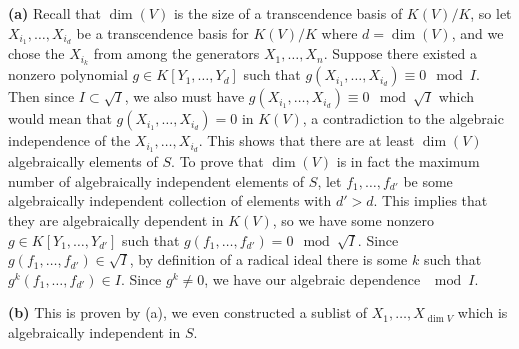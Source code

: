 \documentclass[11pt,letterpaper]{article}
\begin{document}
\begin{solution}
    \textbf{(a)} Recall that $\dim(V)$ is the size of a transcendence basis of $K(V)/K$, so let $X_{i_1}, \ldots, X_{i_d}$ be a transcendence basis for $K(V) /K$ where $d=\dim(V)$, and we chose the $X_{i_k}$ from among the generators $X_1,\ldots,X_n$. Suppose there existed a nonzero polynomial $g\in K[Y_1,\ldots,Y_d]$ such that $g(X_{i_1},\ldots,X_{i_d})\equiv 0\mod I$. Then since $I\subset \sqrt{I}$, we also must have $g(X_{i_1},\ldots,X_{i_d})\equiv 0\mod \sqrt{I}$ which would mean that $g(X_{i_1},\ldots,X_{i_d})=0$ in $K(V)$, a contradiction to the algebraic independence of the $X_{i_1},\ldots,X_{i_d}$. This shows that there are at least $\dim(V)$ algebraically elements of $S$. To prove that $\dim(V)$ is in fact the maximum number of algebraically independent elements of $S$, let $f_1,\ldots,f_{d'}$ be some algebraically independent collection of elements with $d' > d$. This implies that they are algebraically dependent in $K(V)$, so we have some nonzero $g\in K[Y_1,\ldots,Y_{d'}]$ such that $g(f_1,\ldots,f_{d'})=0\mod \sqrt{I}$. Since $g(f_1,\ldots,f_{d'})\in \sqrt{I}$, by definition of a radical ideal there is some $k$ such that $g^k(f_1,\ldots,f_{d'})\in I$. Since $g^k\neq 0$, we have our algebraic dependence $\mod I$.
    
    \textbf{(b)} This is proven by (a), we even constructed a sublist of $X_1,\ldots,X_{\dim V}$ which is algebraically independent in $S$.
\end{solution}



\end{document}
